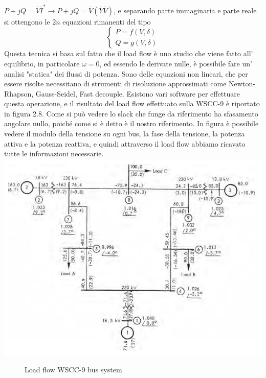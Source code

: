 \documentclass[Lau,noexaminfo]{sapthesis}
\begin{document}
	$P+jQ=\bar{V}\bar{I}^* \rightarrow P+jQ=\bar{V}(\bar{Y}\bar{V})$, e separando parte immaginaria e parte reale si ottengono le $2n$ equazioni rimanenti del tipo\\
	\[
	\begin{cases}
	P=f(V,\delta)\\
	Q=g(V,\delta)
	\end{cases}
	\]
	Questa tecnica si basa sul fatto che il load flow è uno studio che viene fatto all' equilibrio, in particolare $\dot{\omega}=0$, ed essendo le derivate nulle, è possibile fare un' analisi "statica" dei flussi di potenza. Sono delle equazioni non lineari, che per essere risolte necessitano di strumenti di risoluzione approssimati come Newton-Rhapson, Gauss-Seidel, Fast decouple. Esistono vari software per effettuare questa operazione, e il risultato del load flow effettuato sulla WSCC-9 è riportato in figura 2.8. Come si può vedere lo slack che funge da riferimento ha sfasamento angolare nullo, poiché come si è detto è il nostro riferimento. In figura è possibile vedere il modulo della tensione su ogni bus, la fase della tensione, la potenza attiva e la potenza reattiva, e quindi attraverso il load flow abbiamo ricavato tutte le informazioni necessarie. \\
	\includegraphics[scale=0.5]{WSCC-powerflow}
	\begin{figure}
		\centering
		\caption{Load flow WSCC-9 bus system}
	\end{figure}
\end{document}

